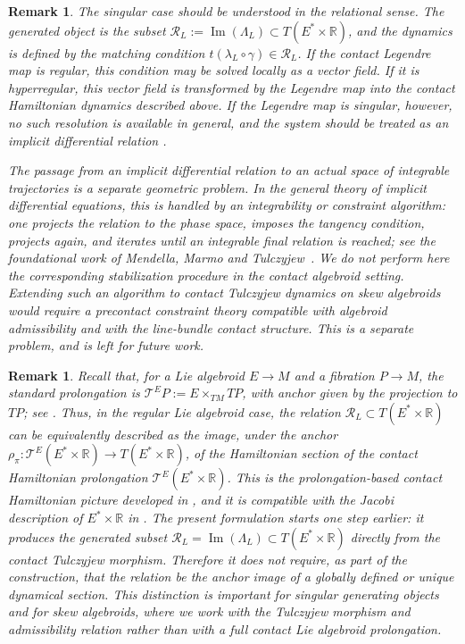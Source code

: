 \documentclass[11pt]{article}
\newtheorem{remark}[theorem]{Remark}
\begin{document}
\begin{remark}
 The singular case should be understood in the relational sense. The generated
object is the subset $\mathcal R_L:=\operatorname{Im}(\Lambda_L)\subset T(E^*\times \mathbb R)$, and the dynamics is defined by the matching condition $t(\lambda_L\circ\gamma)\in \mathcal R_L$. If the contact Legendre map is regular, this condition may be solved locally as
a vector field. If it is hyperregular, this vector field is transformed by the
Legendre map into the contact Hamiltonian dynamics described above. If the
Legendre map is singular, however, no such resolution is available in general,
and the system should be treated as an implicit differential relation \cite{deLeonLainz2019}.

The passage from an implicit differential relation to an actual space of integrable trajectories is a separate geometric problem. In the general theory of implicit differential equations, this is handled by an integrability or constraint algorithm: one projects the relation to the phase space, imposes the tangency condition, projects again, and iterates until an integrable final relation is reached; see the foundational work of Mendella, Marmo and Tulczyjew~\cite{MendellaMarmoTulczyjew1995}. We do not perform here the corresponding stabilization procedure in the contact algebroid setting. Extending such an algorithm to contact Tulczyjew dynamics on skew algebroids would require a precontact constraint theory compatible with algebroid admissibility and with the line-bundle contact structure. This is a separate problem, and is left for future work.
\end{remark}

\begin{remark}
Recall that, for a Lie algebroid \(E\to M\) and a fibration \(P\to M\), the
standard prolongation is
$\mathcal T^E P:=E\times_{TM}TP$,
with anchor given by the projection to \(TP\); see
\cite{Martinez2001}. Thus, in the regular Lie algebroid case, the relation
$\mathcal R_L\subset T(E^*\times\mathbb R)$
can be equivalently described as the image, under the anchor $\rho_\pi:\mathcal T^E(E^*\times\mathbb R)\rightarrow T(E^*\times\mathbb R)$, of the Hamiltonian section of the contact Hamiltonian prolongation
\(\mathcal T^E(E^*\times\mathbb R)\). This is the prolongation-based contact
Hamiltonian picture developed in
\cite{SimoesColomboDeLeonSalgadoSouto2025Annali}, and it is compatible with the
Jacobi description of \(E^*\times\mathbb R\) in
\cite{ASCLMS2024}. The present formulation starts one step earlier: it produces the generated
subset $\mathcal R_L=\operatorname{Im}(\Lambda_L)\subset T(E^*\times\mathbb R)$
directly from the contact Tulczyjew morphism. Therefore it does not require, as
part of the construction, that the relation be the anchor image of a globally
defined or unique dynamical section. This distinction is important for singular
generating objects and for skew algebroids, where we work with the Tulczyjew
morphism and admissibility relation rather than with a full contact Lie
algebroid prolongation.
\end{remark}
\end{document}
